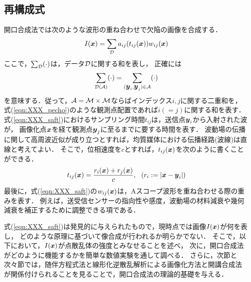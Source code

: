 \subsection{再構成式}
開口合成法では次のような波形の重ね合わせで欠陥の画像を合成する．
\begin{equation}
	I(\mbox{\boldmath $x$})=\sum_{\cal D}a_{ij}(t_{ij}(\mbox{\boldmath $x$}))w_{ij}(\mbox{\boldmath $x$})
	\label{eqn:XXX_saft}
\end{equation}
ここで，$\sum_{\cal D}(\cdot)$は，データ$\cal D$に関する和を表し，
正確には
\begin{equation}
	\sum_{\cal D(A)}
	(\cdot)
	=
	\sum_{(\mbox{\boldmath $y$}_i,\mbox{\boldmath $y$}_j)\in{\cal A}}
	(\cdot)
	\label{eqn:XXX_sum_D}
\end{equation}
を意味する．従って，${\cal A}= {\cal M}\times{\cal M}$ならばインデックス$i,j$に関する二重和を，
式(\ref{eqn:XXX_pecho})のような観測点配置であれば$i(=j)$に関する和を表す．
式(\ref{eqn:XXX_saft})におけるサンプリング時間$t_{ij}$は，送信点$\mbox{\boldmath $y$}_i$から入射された波が，
画像化点$\mbox{\boldmath $x$}$を経て観測点$\mbox{\boldmath $y$}_j$に至るまでに要する時間を表す．
波動場の伝播に関して高周波近似が成り立つとすれば，均質媒体における伝播経路(波線)は直線と考えてよい．
そこで，位相速度を$c$とすれば，$t_{ij}(\mbox{\boldmath $x$})$を次のように書くことができる．
\begin{equation}
	t_{ij}(\fat{x})=\frac{r_i(\fat{x})+r_j(\fat{x})}{c}, \ \ 
	\left(r_i:=\left| \fat{x} -\fat{y}_i\right| \right)
	\label{eqn:XXX_tij}
\end{equation}
最後に，式(\ref{eqn:XXX_saft})の$w_{ij}(\mbox{\boldmath $x$})$は，Aスコープ波形を重ね合わせる際の重みを表す．
例えば，送受信センサーの指向性や感度，波動場の材料減衰や幾何減衰を補正するために調整できる項である．

式(\ref{eqn:XXX_saft})は発見的に与えられたもので，現時点では画像$I(\mbox{\boldmath $x$})$が何を表し，
どのような原理に基づいて像合成が行われるか明らかでない．
そこで，以下において，$I(\mbox{\boldmath $x$})$が点散乱体の強度とみなせることを述べ，
次に，開口合成法がどのように機能するかを簡単な数値実験を通して調べる．
さらに，次節と次々節では，随伴方程式法と線形化逆散乱解析による画像化方法と開講合成法
が関係付けられることを見ることで，開口合成法の理論的基礎を与える．
